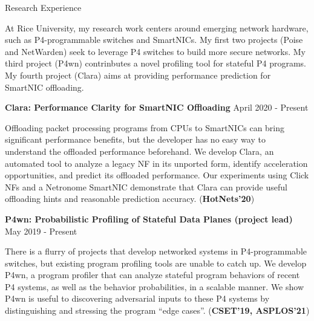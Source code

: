 \documentclass{resume} %
\begin{document}
\begin{rSection}{Research Experience}

\vspace{2mm}

At Rice University, my research work centers around emerging network hardware,
such as P4-programmable switches and SmartNICs.
My first two projects (Poise and NetWarden) seek to leverage P4 switches to build more secure networks.
My third project (P4wn) contrinbutes a novel profiling tool for stateful P4 programs.
My fourth project (Clara) aims at providing performance prediction for SmartNIC offloading.

\vspace{2mm}

\item {\bf Clara: Performance Clarity for SmartNIC Offloading} \hfill { April 2020 - Present}

Offloading packet processing programs from CPUs to SmartNICs can bring significant performance benefits,
but the developer has no easy way to understand the offloaded performance beforehand.
We develop Clara, an automated tool to analyze a legacy NF in its unported form,
identify acceleration opportunities, and predict its offloaded performance.
Our experiments using Click NFs and a Netronome SmartNIC demonstrate that Clara
can provide useful offloading hints and reasonable prediction accuracy.
({\bf HotNets'20})

\vspace{3mm}

\item {\bf P4wn: Probabilistic Profiling of Stateful Data Planes (project lead)}    \hfill { May 2019 - Present}

There is a flurry of projects that develop networked systems in P4-programmable switches,
but existing program profiling tools are unable to catch up.
We develop P4wn, a program profiler that can analyze stateful program behaviors
of recent P4 systems, as well as the behavior probabilities, in a scalable manner.
We show P4wn is useful to discovering adversarial inputs to these P4 systems
by distinguishing and stressing the program ``edge cases''.
({\bf CSET'19, ASPLOS'21})

\vspace{3mm}


\end{rSection}
\end{document}
